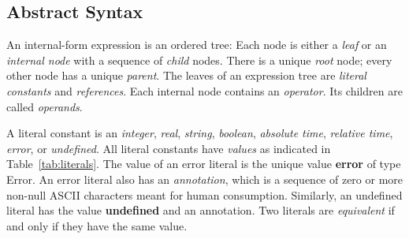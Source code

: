 \documentclass{article}
\begin{document}
\subsection{Abstract Syntax}
\label{sec:abstract_syntax}

An internal-form expression is an ordered tree:  Each node is either a
\emph{leaf} or an \emph{internal node} with a sequence of \emph{child} nodes.
There is a unique \emph{root} node; every other node has a unique
\emph{parent}.  The leaves of an expression tree are \emph{literal constants}
and \emph{references}.  Each internal node contains an \emph{operator}.  Its
children are called \emph{operands}.

A literal constant is
an \emph{integer}, \emph{real}, \emph{string}, \emph{boolean},
\emph{absolute time},
\emph{relative time},
\emph{error}, or \emph{undefined}.
All literal constants have \emph{values} as indicated in
Table~\ref{tab:literals}.
The value of an error literal is the unique value \textbf{error} of type Error.
An error literal also has an \emph{annotation}, which is a sequence
of zero or more non-null ASCII characters meant for human consumption.
Similarly, an undefined literal has the value \textbf{undefined} and an
annotation.
Two literals are \emph{equivalent} if and only if they have the same value.
\end{document}
